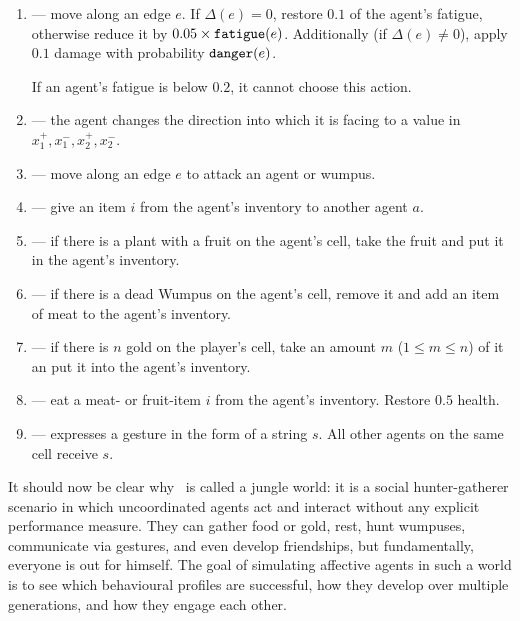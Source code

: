 \begin{definition}
\begin{description}
	\begin{enumerate}
		\item[\action{move}] --- move along an edge $e$. If $\Delta(e) = 0$, restore $0.1$ of the agent's fatigue, otherwise reduce it by $0.05 \times \mathtt{fatigue}(e)$. Additionally (if $\Delta(e) \neq 0$), apply $0.1$ damage with probability $\mathtt{danger}(e)$.
		
		If an agent's fatigue is below $0.2$, it cannot choose this action.
		
		\item[\action{rotate}] --- the agent changes the direction into which it is facing to a value in ${x_1^+,x_1^-,x_2^+,x_2^-}$.
		
		\item[\action{attack}] --- move along an edge $e$ to attack an agent or wumpus.
		
		\item[\action{give}] --- give an item $i$ from the agent's inventory to another agent $a$.
		
		\item[\action{gather}] --- if there is a plant with a fruit on the agent's cell, take the fruit and put it in the agent's inventory.
		
		\item[\action{butcher}] --- if there is a dead Wumpus on the agent's cell, remove it and add an item of meat to the agent's inventory.
		
		\item[\action{collect}] --- if there is $n$ gold on the player's cell, take an amount $m$ ($1 \leq m \leq n$) of it an put it into the agent's inventory.
		
		\item[\action{eat}] --- eat a meat- or fruit-item $i$ from the agent's inventory. Restore $0.5$ health.
		
		\item[\action{gesture}] --- expresses a gesture in the form of a string $s$. All other agents on the same cell receive $s$.
	\end{enumerate}
	
\end{description}
\end{definition}

It should now be clear why \wjun\ is called a jungle world: it is a social hunter-gatherer scenario in which uncoordinated agents act and interact without any explicit performance measure. They can gather food or gold, rest, hunt wumpuses, communicate via gestures, and even develop friendships, but fundamentally, everyone is out for himself. The goal of simulating affective agents in such a world is to see which behavioural profiles are successful, how they develop over multiple generations, and how they engage each other.

